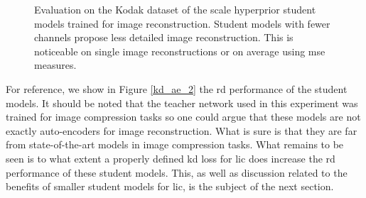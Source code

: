 \documentclass{article}
\begin{document}
\begin{figure}[H]
    \centering
    \qquad
    \caption[Evaluation on the Kodak dataset of the scale hyperprior student models trained for image reconstruction.]{Evaluation on the Kodak dataset of the scale hyperprior student models trained for image reconstruction. Student models with fewer channels propose less detailed image reconstruction. This is noticeable on single image reconstructions or on average using \acrshort{mse} measures.}
    \label{kd_ae_1}
\end{figure}

For reference, we show in Figure \ref{kd_ae_2} the \acrshort{rd} performance of the student models. It should be noted that the teacher network used in this experiment was trained for image compression tasks so one could argue that these models are not exactly auto-encoders for image reconstruction. What is sure is that they are far from state-of-the-art models in image compression tasks. What remains to be seen is to what extent a properly defined \acrshort{kd} loss for \acrshort{lic} does increase the \acrshort{rd} performance of these student models. This, as well as discussion related to the benefits of smaller student models for \acrshort{lic}, is the subject of the next section.
\end{document}

